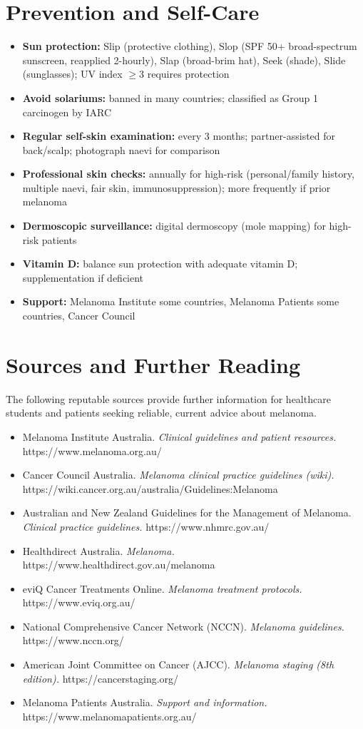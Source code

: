 \section*{Prevention and Self-Care}
\begin{itemize}
    \item \textbf{Sun protection:} Slip (protective clothing), Slop (SPF 50+ broad-spectrum sunscreen, reapplied 2-hourly), Slap (broad-brim hat), Seek (shade), Slide (sunglasses); UV index $\ge$3 requires protection
    \item \textbf{Avoid solariums:} banned in many countries; classified as Group 1 carcinogen by IARC
    \item \textbf{Regular self-skin examination:} every 3 months; partner-assisted for back/scalp; photograph naevi for comparison
    \item \textbf{Professional skin checks:} annually for high-risk (personal/family history, multiple naevi, fair skin, immunosuppression); more frequently if prior melanoma
    \item \textbf{Dermoscopic surveillance:} digital dermoscopy (mole mapping) for high-risk patients
    \item \textbf{Vitamin D:} balance sun protection with adequate vitamin D; supplementation if deficient
    \item \textbf{Support:} Melanoma Institute some countries, Melanoma Patients some countries, Cancer Council
\end{itemize}

\section*{Sources and Further Reading}
The following reputable sources provide further information for healthcare students and patients seeking reliable, current advice about melanoma.

\begin{itemize}
    \item Melanoma Institute Australia. \textit{Clinical guidelines and patient resources.} https://www.melanoma.org.au/
    \item Cancer Council Australia. \textit{Melanoma clinical practice guidelines (wiki).} https://wiki.cancer.org.au/australia/Guidelines:Melanoma
    \item Australian and New Zealand Guidelines for the Management of Melanoma. \textit{Clinical practice guidelines.} https://www.nhmrc.gov.au/
    \item Healthdirect Australia. \textit{Melanoma.} https://www.healthdirect.gov.au/melanoma
    \item eviQ Cancer Treatments Online. \textit{Melanoma treatment protocols.} https://www.eviq.org.au/
    \item National Comprehensive Cancer Network (NCCN). \textit{Melanoma guidelines.} https://www.nccn.org/
    \item American Joint Committee on Cancer (AJCC). \textit{Melanoma staging (8th edition).} https://cancerstaging.org/
    \item Melanoma Patients Australia. \textit{Support and information.} https://www.melanomapatients.org.au/
\end{itemize}